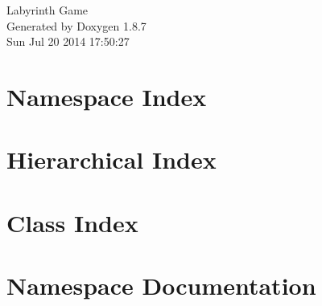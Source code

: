 \documentclass[twoside]{book}
\newcommand{\+}{\discretionary{\mbox{\scriptsize$\hookleftarrow$}}{}{}}
\newcommand{\clearemptydoublepage}{%
  \newpage{\pagestyle{empty}\cleardoublepage}%
}
\begin{document}
\hypersetup{pageanchor=false,
             bookmarks=true,
             bookmarksnumbered=true,
             pdfencoding=unicode
            }
\begin{titlepage}
\vspace*{7cm}
\begin{center}%
{\Large Labyrinth Game }\\
\vspace*{1cm}
{\large Generated by Doxygen 1.8.7}\\
\vspace*{0.5cm}
{\small Sun Jul 20 2014 17:50:27}\\
\end{center}
\end{titlepage}
\clearemptydoublepage
\tableofcontents
\clearemptydoublepage
{}
\hypersetup{pageanchor=true}

\chapter{Namespace Index}

\chapter{Hierarchical Index}

\chapter{Class Index}

\chapter{Namespace Documentation}








\end{document}
